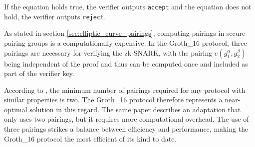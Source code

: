 If the equation holds true, the verifier outputs \texttt{accept} and the equation does not hold, the verifier outputs \texttt{reject}.

\begin{remark}
As stated in section \ref{sec:elliptic_curve_pairings}, computing pairings in secure pairing groups is a computationally expensive. In the Groth\_16 protocol, three pairings are necessary for verifying the zk-SNARK, with the pairing $e(g_1^\alpha,g_2^\beta)$ being independent of the proof and thus can be computed once and included as part of the verifier key.

According to \cite{Groth16}, the minimum number of pairings required for any protocol with similar properties is two. The Groth\_16 protocol therefore represents a near-optimal solution in this regard. The same paper describes an adaptation that only uses two pairings, but it requires more computational overhead. The use of three pairings strikes a balance between efficiency and performance, making the Groth\_16 protocol the most efficient of its kind to date.
\end{remark}

